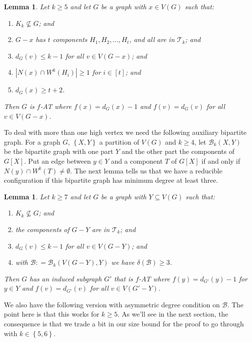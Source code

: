 \documentclass[12pt]{article}
\theoremstyle{plain}
\newtheorem{lem}[thm]{Lemma}
\theoremstyle{definition}
\theoremstyle{remark}
\newcommand{\fancy}[1]{\mathcal{#1}}
\newcommand{\T}{\fancy{T}}
\newcommand{\B}{\fancy{B}}
\newcommand{\set}[1]{\left\{ #1 \right\}}
\newcommand{\card}[1]{\left|#1\right|}
\newcommand{\irange}[1]{\left[#1\right]}
\newcommand{\DefinedAs}{\mathrel{\mathop:}=}
\begin{document}
\begin{lem}\label{ConfigurationTypeOneEuler}
Let $k \ge 5$ and let $G$ be a graph with $x \in V(G)$ such that:
\begin{enumerate}
\item $K_k \not \subseteq G$; and
\item $G-x$ has $t$ components $H_1, H_2, \ldots, H_t$, and all are in $\T_k$; and
\item $d_G(v) \leq k - 1$ for all $v \in V(G-x)$; and
\item $\card{N(x) \cap W^k(H_i)} \ge 1$ for $i \in \irange{t}$; and
\item $d_G(x) \ge t+2$.
\end{enumerate}

\noindent Then $G$ is $f$-AT where $f(x) = d_G(x) - 1$ and $f(v) = d_G(v)$ for all $v \in V(G - x)$.
\end{lem}

To deal with more than one high vertex we need the following auxiliary bipartite graph.  For a graph $G$, $\set{X, Y}$ a partition of $V(G)$ and $k \ge 4$, let $\B_k(X, Y)$ be the bipartite graph with one part $Y$ and the other part the components of $G[X]$.  Put an edge between $y \in Y$ and a component $T$ of $G[X]$ if and only if $N(y) \cap W^k(T) \ne \emptyset$.   The next lemma tells us that we have a reducible configuration if this bipartite graph has minimum degree at least three.  

\begin{lem}
	\label{MultipleHighConfigurationEuler} Let $k\ge7$ and let $G$ be a graph with
	$Y\subseteq V(G)$ such that: 
	\begin{enumerate}
		\item $K_{k}\not\subseteq G$; and 
		\item the components of $G-Y$ are in $\T_{k}$; and 
		\item $d_{G}(v)\leq k-1$ for all $v\in V(G-Y)$; and 
		\item with $\B\DefinedAs\B_{k}(V(G-Y),Y)$ we have $\delta(\B)\ge3$. 
	\end{enumerate}
	\noindent Then $G$ has an induced subgraph $G'$ that is $f$-AT where $f(y)=d_{G'}(y)-1$
	for $y\in Y$ and $f(v)=d_{G'}(v)$ for all $v\in V(G'-Y)$.\end{lem}

We also have the following version with asymmetric degree condition on $\B$.  The point here is that this works for $k \ge 5$.  As we'll see in the next section, the consequence is that we trade a bit in our size bound for the proof to go through with $k \in \set{5,6}$.
\end{document}
